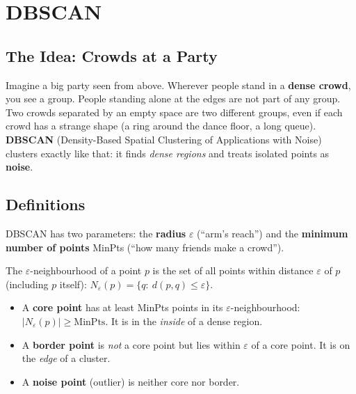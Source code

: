 \section{DBSCAN}\label{sec:dbscan}

\subsection{The Idea: Crowds at a Party}

Imagine a big party seen from above. Wherever people stand in a \textbf{dense crowd}, you see a group. People standing alone at the edges are not part of any group. Two crowds separated by an empty space are two different groups, even if each crowd has a strange shape (a ring around the dance floor, a long queue). \textbf{DBSCAN} (Density-Based Spatial Clustering of Applications with Noise) clusters exactly like that: it finds \emph{dense regions} and treats isolated points as \textbf{noise}.

\subsection{Definitions}

DBSCAN has two parameters: the \textbf{radius} $\varepsilon$ (``arm's reach'') and the \textbf{minimum number of points} MinPts (``how many friends make a crowd'').

\begin{definition}
The $\varepsilon$-neighbourhood of a point $p$ is the set of all points within distance $\varepsilon$ of $p$ (including $p$ itself): $N_\varepsilon(p)=\{q:\ d(p,q)\le\varepsilon\}$.
\end{definition}

\begin{definition}
\begin{itemize}
  \item A \textbf{core point} has at least MinPts points in its $\varepsilon$-neighbourhood: $|N_\varepsilon(p)|\ge\text{MinPts}$. It is in the \emph{inside} of a dense region.
  \item A \textbf{border point} is \emph{not} a core point but lies within $\varepsilon$ of a core point. It is on the \emph{edge} of a cluster.
  \item A \textbf{noise point} (outlier) is neither core nor border.
\end{itemize}
\end{definition}

